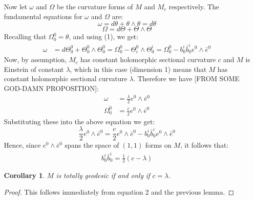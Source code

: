 \documentclass[11pt]{amsart}
\newtheorem{cor}[subsection]{Corollary}
\theoremstyle{definition}
\theoremstyle{definition}
\begin{document}
Now let $\omega$ and $\Omega$ be the curvature forms of $M$ and $M_c$ respectively.  The fundamental equations for $\omega$ and $\Omega$ are:
%
$$\omega =  d\theta + \theta \wedge \theta = d\theta$$
%
$$\Omega = d\Theta + \Theta \wedge \Theta$$
%
Recalling that $\Omega^0_0 = \theta$, and using (1), we get:
%
\begin{align*}
\omega &= d\Theta^0_0 + \Theta^0_0 \wedge \Theta^0_0 = \Omega^0_0 - \Theta^0_i \wedge \Theta^i_0 = \Omega^0_0 - b^i_0 \bar{b}^i_0 e^0 \wedge \bar{e}^0
\end{align*}
%
Now, by assumption, $M_c$ has constant holomorphic sectional curvature $c$ and $M$ is Einstein of constant $\lambda$, which in this case (dimension 1) means that $M$ has constant holomorphic sectional curvature $\lambda$.  Therefore we have [FROM SOME GOD-DAMN PROPOSITION]:
%
\begin{align*}
\omega &= \frac{\lambda}{2}e^0 \wedge \bar{e}^0 \\
\Omega^0_0 &= \frac{c}{2} e^0 \wedge \bar{e}^0
\end{align*}
%
Substituting these into the above equation we get:
%
$$\frac{\lambda}{2}e^0 \wedge \bar{e}^0 = \frac{c}{2} e^0 \wedge \bar{e}^0- b^i_0 \bar{b}^i_0 e^0 \wedge \bar{e}^0$$
%
Hence, since $e^0 \wedge \bar{e}^0$ spans the space of $(1,1)$ forms on $M$,  it follows that:
%
\begin{align}
b^i_0 \bar{b}^i_0 = \frac{1}{2}(c - \lambda)
\end{align}

\begin{cor} $M$ is totally geodesic if and only if $c = \lambda$.
\end{cor}
%
\begin{proof} This follows immediately from equation 2 and the previous lemma.
\end{proof}
\end{document}
